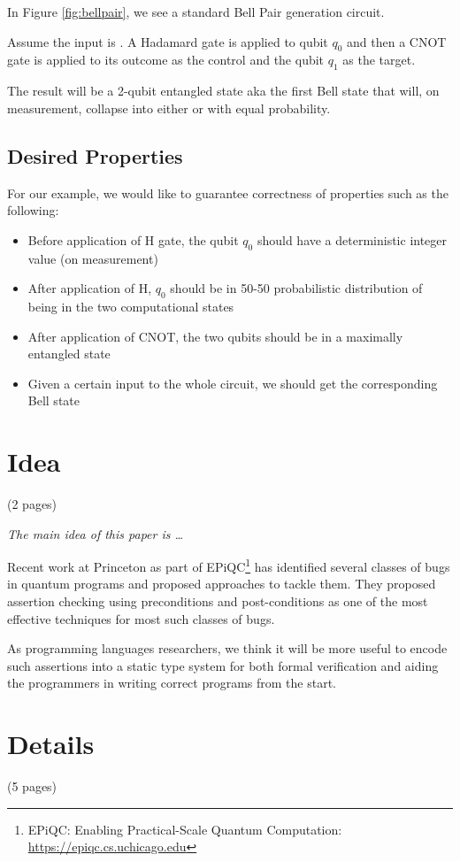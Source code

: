 \documentclass[acmsmall,review]{acmart}\settopmatter{printfolios=true,printccs=false,printacmref=false}
\begin{document}
In Figure \ref{fig:bellpair}, we see a standard Bell Pair generation circuit.

Assume the input is . A Hadamard gate is applied to qubit $q_0$ and then a CNOT gate is applied to its outcome as the control and the qubit $q_1$ as the target.

The result will be a 2-qubit entangled state aka the first Bell state that will, on measurement, collapse into either  or  with equal probability.


\subsection{Desired Properties}
For our example, we would like to guarantee correctness of properties such as the following:
\begin{itemize}
	\item Before application of H gate, the qubit $q_0$ should have a deterministic integer value (on measurement)
	\item After application of H, $q_0$ should be in 50-50 probabilistic distribution of being in the two computational states
	\item After application of CNOT, the two qubits should be in a maximally entangled state
	\item Given a certain input to the whole circuit, we should get the corresponding Bell state
\end{itemize}

\section{Idea}
(2 pages)

\textit{The main idea of this paper is \ldots}

Recent work at Princeton as part of EPiQC\footnote{EPiQC: Enabling Practical-Scale Quantum Computation:  \url{https://epiqc.cs.uchicago.edu}}\cite{huang2018,huang2019} has identified several classes of bugs in quantum programs and proposed approaches to tackle them. They proposed assertion checking using preconditions and post-conditions as one of the most effective techniques for most such classes of bugs.

As programming languages researchers, we think it will be more useful to encode such assertions into a static type system for both formal verification and aiding the programmers in writing correct programs from the start.

\section{Details}
(5 pages)
\end{document}
